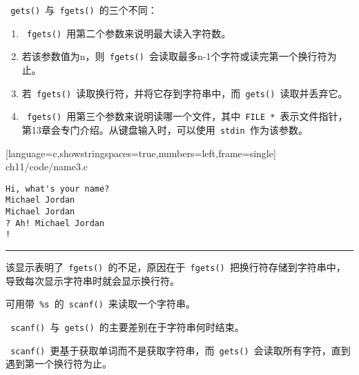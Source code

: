 \begin{frame}[fragile] 
\lstinline| gets() |与\lstinline| fgets() |的三个不同： \vspace{.1in}

\begin{enumerate}
\item \lstinline| fgets() |用第二个参数来说明最大读入字符数。
\item[] 若该参数值为{\tf n}，则\lstinline| fgets() |会读取最多{\tf n-1}个字符或读完第一个换行符为止。\\[0.1in]
\item 若\lstinline| fgets() |读取换行符，并将它存到字符串中，而\lstinline| gets() |读取并丢弃它。\\[0.1in]
\item \lstinline| fgets() |用第三个参数来说明读哪一个文件，其中\lstinline| FILE * |表示文件指针，第13章会专门介绍。从键盘输入时，可以使用\lstinline| stdin |作为该参数。
\end{enumerate}
\end{frame}

\begin{frame}[fragile] 

[language=c,showstringspaces=true,numbers=left,frame=single]
{ch11/code/name3.c}
\end{frame}

\begin{frame}[fragile] 
\begin{lstlisting}[]
Hi, what's your name?
Michael Jordan
Michael Jordan
? Ah! Michael Jordan
!
\end{lstlisting}
\rule{\textwidth}{0.3mm} \pause \vspace{.1in}

该显示表明了\lstinline| fgets() |的不足，原因在于\lstinline| fgets() |把换行符存储到字符串中，导致每次显示字符串时就会显示换行符。 
\end{frame}

\begin{frame}[fragile] 

可用带\lstinline| %s |的\lstinline| scanf() |来读取一个字符串。 \vspace{.1in}

\lstinline| scanf() |与\lstinline| gets() |的主要差别在于字符串何时结束。\vspace{.1in}

\lstinline| scanf() |更基于获取单词而不是获取字符串，而\lstinline| gets() |会读取所有字符，直到遇到第一个换行符为止。
\end{frame}

